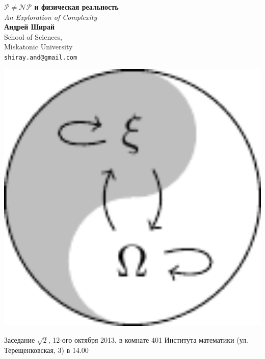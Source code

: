 \documentclass[a0,portrait]{a0poster}
\begin{document}


\begin{minipage}[b]{0.75\linewidth}
\veryHuge \color{NavyBlue} \textbf{$\mathcal{P}\neq\mathcal{NP}$ и физическая реальность} \color{Black}\\ 
\Huge\textit{An Exploration of Complexity}\\[2cm] %
\huge \textbf{Андрей Ширай}\\[0.5cm] %
\huge School of Sciences,\\
   Miskatonic University\\[0.4cm] %
\Large \texttt{shiray.and@gmail.com} \\
\end{minipage}
%
\begin{minipage}[b]{0.25\linewidth}
\includegraphics[width=20cm]{../ccs_logo.pdf}\\
\end{minipage}
Заседание \textnumero $\sqrt{2}$, 12-ого октября 2013, в комнате 401 Института математики (ул. Терещенковская, 3)  в 14.00
\vspace{1cm} %
\end{document}
